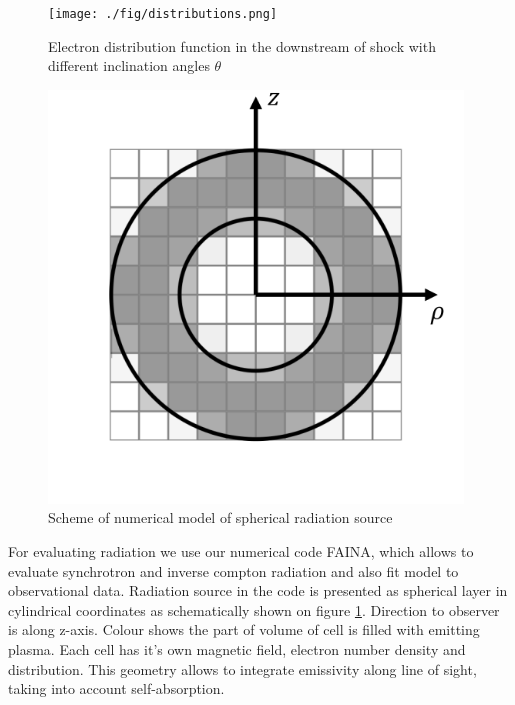 \documentclass[a4paper,12pt]{extreport}
\begin{document}
\begin{figure}[h!]
	\centering
	\begin{minipage}{0.48\textwidth}
		\centering
		\texttt{[image: ./fig/distributions.png]} 
		\caption{Electron distribution function in the downstream of shock with different inclination angles $\theta$}
		\label{distributions}
	\end{minipage}\hfill
	\begin{minipage}{0.48\textwidth}
		\centering
		\includegraphics[width=0.98\textwidth]{./fig/sphericalSource.png} 
		\caption{Scheme of numerical model of spherical radiation source}
		\label{sphericalSource}
	\end{minipage}
\end{figure}

For evaluating radiation we use our numerical code FAINA, which allows to evaluate synchrotron and inverse compton radiation and also fit model to observational data. Radiation source in the code is presented as spherical layer in cylindrical coordinates as schematically shown on figure \ref{sphericalSource}. Direction to observer is along z-axis. Colour shows the part of volume of cell is filled with emitting plasma. Each cell has it's own magnetic field, electron number density and distribution. This geometry allows to integrate emissivity along line of sight, taking into account self-absorption.
\end{document}
